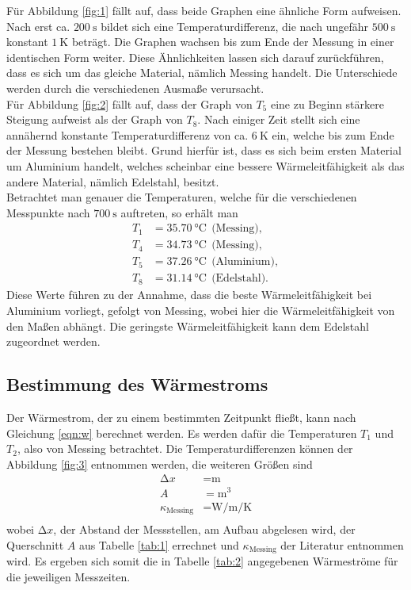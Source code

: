 Für Abbildung \ref{fig:1} fällt auf, dass beide Graphen eine ähnliche Form aufweisen.
Nach erst ca. $\SI{200}{\second}$ bildet sich eine Temperaturdifferenz, die nach ungefähr $\SI{500}{\second}$ konstant $\SI{1}{\kelvin}$ beträgt.
Die Graphen wachsen bis zum Ende der Messung in einer identischen Form weiter.
Diese Ähnlichkeiten lassen sich darauf zurückführen, dass es sich um das gleiche Material, nämlich Messing handelt.
Die Unterschiede werden durch die verschiedenen Ausmaße verursacht.\\
Für Abbildung \ref{fig:2} fällt auf, dass der Graph von $T_5$ eine zu Beginn stärkere Steigung aufweist als der Graph von $T_8$.
Nach einiger Zeit stellt sich eine annähernd konstante Temperaturdifferenz von ca. $\SI{6}{\kelvin}$ ein, welche bis zum Ende der Messung bestehen bleibt.
Grund hierfür ist, dass es sich beim ersten Material um Aluminium handelt, welches scheinbar eine bessere Wärmeleitfähigkeit als das andere Material, nämlich Edelstahl, besitzt.\\
Betrachtet man genauer die Temperaturen, welche für die verschiedenen Messpunkte nach $\SI{700}{\second}$ auftreten, so erhält man
\begin{align*}
  T_1 &= \SI{35.70}{\celsius}  \:\: \text{(Messing)}, \\
  T_4 &= \SI{34.73}{\celsius} \:\: \text{(Messing)}, \\
  T_5 &= \SI{37.26}{\celsius} \:\: \text{(Aluminium)}, \\
  T_8 &= \SI{31.14}{\celsius} \:\: \text{(Edelstahl}).
\end{align*}
Diese Werte führen zu der Annahme, dass die beste Wärmeleitfähigkeit bei Aluminium vorliegt, gefolgt von Messing, wobei hier die Wärmeleitfähigkeit von den Maßen abhängt.
Die geringste Wärmeleitfähigkeit kann dem Edelstahl zugeordnet werden.\\


\subsection{Bestimmung des Wärmestroms}


Der Wärmestrom, der zu einem bestimmten Zeitpunkt fließt, kann nach Gleichung \ref{eqn:w} berechnet werden.
Es werden dafür die Temperaturen $T_1$ und $T_2$, also von Messing betrachtet.
Die Temperaturdifferenzen können der Abbildung \ref{fig:3} entnommen werden, die weiteren Größen sind
\begin{align*}
  \increment{x} &= \si{\metre} \\
  A &= \si{\metre\tothe{3}} \\
  \kappa_\text{Messing} &= \si{\watt\per\metre\per\kelvin} \\
\end{align*}
wobei $\increment{x}$, der Abstand der Messstellen, am Aufbau abgelesen wird, der Querschnitt $A$ aus Tabelle \ref{tab:1} errechnet und $\kappa_\text{Messing}$ der Literatur \cite{etb} entnommen wird.
Es ergeben sich somit die in Tabelle \ref{tab:2} angegebenen Wärmeströme für die jeweiligen Messzeiten.

